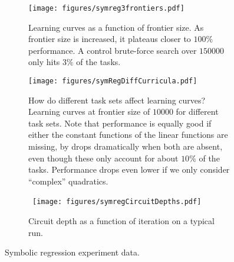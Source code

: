 \documentclass{article}
\begin{document}
\begin{figure}[h]
\centering
\begin{subfigure}[Before]{\linewidth}
\texttt{[image: figures/symreg3frontiers.pdf]}
\label{fig:symregLearning}
\caption{Learning curves as a function of frontier size.  As frontier
  size is increased, it plateaus closer to $100\%$ performance. A
  control brute-force search over $150000$ only hits $3\%$ of the
  tasks.}
\end{subfigure}

\begin{subfigure}[After]{.65\linewidth}
\texttt{[image: figures/symRegDiffCurricula.pdf]}
\caption{How do different task sets affect learning curves? Learning
  curves at frontier size of $10000$ for different task sets. Note
  that performance is equally good if either the constant functions of
  the linear functions are missing, by drops dramatically when both
  are absent, even though these only account for about $10\%$ of the
  tasks. Performance drops even lower if we only consider ``complex'' quadratics.}
\label{fig:symregCurricula}
\end{subfigure}
\begin{subfigure}[After]{.3\linewidth}\
\texttt{[image: figures/symregCircuitDepths.pdf]}
\caption{Circuit depth as a function of iteration on a typical run.}
\label{fig:symregDepths}
\end{subfigure}


\caption{Symbolic regression experiment data.}
\label{fig:symreg} 
\end{figure}



\end{document}
